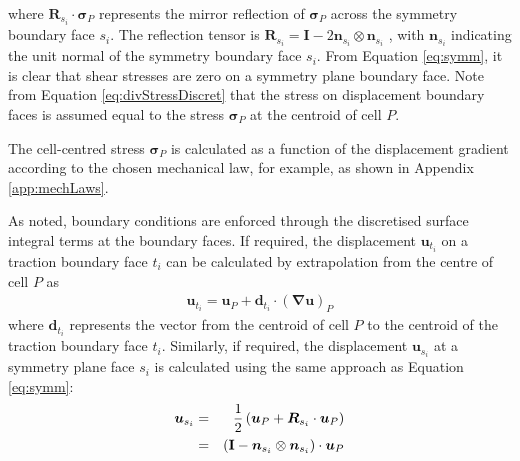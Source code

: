 \documentclass[sn-mathphys,Numbered]{sn-jnl}%
\newcommand{\bb}{\boldsymbol}
\begin{document}
where $\bb{R}_{s_i} \cdot \bb{\sigma}_{P}$ represents the mirror reflection of $\bb{\sigma}_P$ across the symmetry boundary face $s_i$.
The reflection tensor is $\bb{R}_{s_i} = \textbf{I} - 2 \bb{n}_{s_i} \otimes \bb{n}_{s_i}$ \citep{Demirdzic2022}, with $\bb{n}_{s_i}$ indicating the unit normal of the symmetry boundary face $s_i$.
From Equation \ref{eq:symm}, it is clear that shear stresses are zero on a symmetry plane boundary face.
Note from Equation \ref{eq:divStressDiscret} that the stress on displacement boundary faces is assumed equal to the stress $\bb{\sigma}_P$ at the centroid of cell $P$.

The cell-centred stress $\bb{\sigma}_P$ is calculated as a function of the displacement gradient according to the chosen mechanical law, for example, as shown in Appendix \ref{app:mechLaws}.


As noted, boundary conditions are enforced through the discretised surface integral terms at the boundary faces. %
If required, the displacement $\bb{u}_{t_i}$ on a traction boundary face $t_i$ can be calculated by extrapolation from the centre of cell $P$ as
\begin{eqnarray}
	\bb{u}_{t_i} = \bb{u}_P + \bb{d}_{t_i} \cdot \left(\bb{\nabla} \bb{u} \right)_P
\end{eqnarray}
where $\bb{d}_{t_i}$ represents the vector from the centroid of cell $P$ to the centroid of the traction boundary face $t_i$.
Similarly, if required, the displacement $\bb{u}_{s_i}$ at a symmetry plane face $s_i$ is calculated using the same approach as Equation \ref{eq:symm}:
\begin{eqnarray} 
	\bb{u}_{s_i}
		&=&  \frac{1}{2} \left( \bb{u}_P + \bb{R}_{s_i} \cdot \bb{u}_P \right) \notag \\
		&=& \left (\textbf{I} - \bb{n}_{s_i} \otimes \bb{n}_{s_i} \right) \cdot \bb{u}_P
\end{eqnarray}
\end{document}
